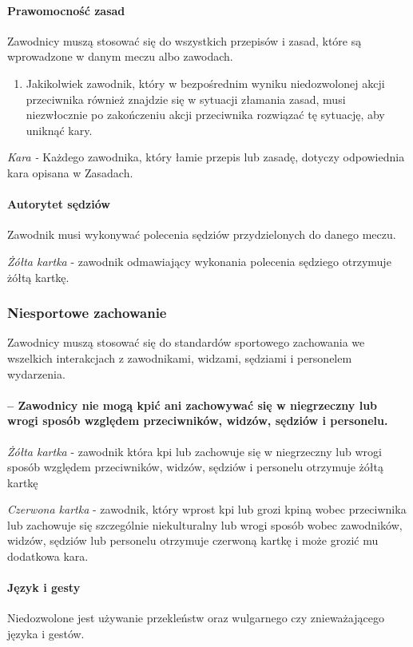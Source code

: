 \documentclass[12pt]{article}
\begin{document}
\paragraph{Prawomocność zasad}
Zawodnicy muszą stosować się do
wszystkich przepisów i zasad, które są wprowadzone w danym meczu albo
zawodach.
\begin{enumerate}
\item Jakikolwiek zawodnik, który w bezpośrednim wyniku niedozwolonej akcji
przeciwnika również znajdzie się w sytuacji złamania zasad, musi
niezwłocznie po zakończeniu akcji przeciwnika rozwiązać tę sytuację, aby
uniknąć kary.
\end{enumerate}

\emph{Kara -} Każdego zawodnika, który łamie przepis lub zasadę, dotyczy
odpowiednia kara opisana w Zasadach.

\paragraph{Autorytet sędziów}
Zawodnik musi wykonywać polecenia
sędziów przydzielonych do danego meczu.

\emph{Żółta kartka} - zawodnik odmawiający wykonania polecenia sędziego
otrzymuje żółtą kartkę.

\subsubsection{Niesportowe zachowanie}

Zawodnicy muszą stosować się do standardów sportowego zachowania we
wszelkich interakcjach z zawodnikami, widzami, sędziami i personelem
wydarzenia.

\paragraph{-- Zawodnicy nie mogą kpić ani zachowywać się w
niegrzeczny lub wrogi sposób względem przeciwników, widzów, sędziów i
personelu.}

\emph{Żółta kartka} - zawodnik która kpi lub zachowuje się w niegrzeczny
lub wrogi sposób względem przeciwników, widzów, sędziów i personelu
otrzymuje żółtą kartkę

\emph{Czerwona kartka} - zawodnik, który wprost kpi lub grozi kpiną
wobec przeciwnika lub zachowuje się szczególnie niekulturalny lub wrogi
sposób wobec zawodników, widzów, sędziów lub personelu otrzymuje
czerwoną kartkę i może grozić mu dodatkowa kara.

\paragraph{Język i gesty}
Niedozwolone jest używanie przekleństw
oraz wulgarnego czy znieważającego języka i gestów.
\end{document}
